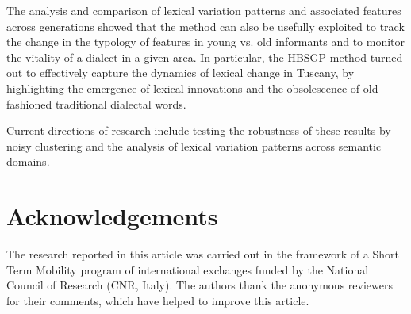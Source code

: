 \documentclass[output=paper]{LSP/langsci}
\begin{document}
The analysis and comparison of lexical variation patterns and associated features across generations showed that the method can also be usefully exploited to track the change in the typology of features in young vs. old informants and to monitor the vitality of a dialect in a given area. In particular, the HBSGP method turned out to effectively capture the dynamics of lexical change in Tuscany, by highlighting the emergence of lexical innovations and the obsolescence of old-fashioned traditional dialectal words. 

Current directions of research include testing the robustness of these results by noisy clustering and the analysis of lexical variation patterns across semantic domains.

\section*{Acknowledgements}
The research reported in this article was carried out in  the framework  of  a  Short  Term  Mobility  program   of international   exchanges   funded   by   the National Council of Research (CNR, Italy). The authors thank the anonymous reviewers for their comments,  which  have  helped  to  improve  this  article.


\printbibliography[heading=subbibliography,notkeyword=this]
\end{document}
